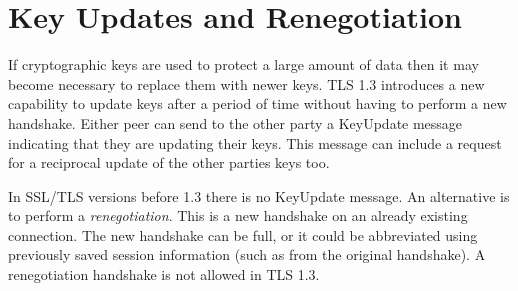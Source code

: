 \section{Key Updates and Renegotiation}

If cryptographic keys are used to protect a large amount of data then it may
become necessary to replace them with newer keys. TLS 1.3 introduces a new
capability to update keys after a period of time without having to perform a new
handshake. Either peer can send to the other party a KeyUpdate message
indicating that they are updating their keys. This message can include a request
for a reciprocal update of the other parties keys too.

In SSL/TLS versions before 1.3 there is no KeyUpdate message. An alternative is
to perform a \emph{renegotiation}. This is a new handshake on an already
existing connection. The new handshake can be full, or it could be abbreviated
using previously saved session information (such as from the original
handshake). A renegotiation handshake is not allowed in TLS 1.3.
